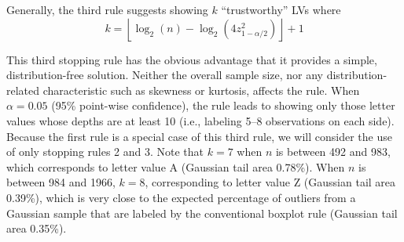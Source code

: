 \documentclass[11pt]{article}
\begin{document}
Generally, the third rule suggests showing $k$  ``trustworthy'' LVs where
\begin{equation}
k =  \left \lfloor \log_2 (n) - \log_2 
   \left(4  z_{1-\alpha/2}^2 \right) \right \rfloor + 1
\end{equation}

This third stopping rule has the obvious advantage that it provides a 
simple, distribution-free solution. Neither the overall sample size,
nor any distribution-related characteristic such as skewness or 
kurtosis, affects the rule.
When $\alpha = 0.05$ (95\% point-wise confidence), the rule
leads to showing only those letter values whose depths are
at least 10 (i.e., labeling 5--8 observations on each side).
Because the first rule is a special case of this third rule,
we will consider the use of only stopping rules 2 and 3.
Note that $k = 7$ when $n$ is
between 492 and 983, which corresponds to letter value A
(Gaussian tail area 0.78\%).  When $n$ is between 984 and 1966, 
$k = 8$, corresponding to letter value Z (Gaussian tail area 0.39\%),
which is very close to the expected percentage of outliers 
from a Gaussian sample that are labeled by the conventional
boxplot rule (Gaussian tail area 0.35\%).

\end{document}
